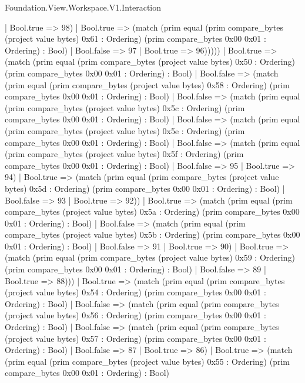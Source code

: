 \begin{lexlean}{Foundation.View.Workspace.V1.Interaction}
\begin{semanticmodule}
{                    | Bool.true => 98)
                  | Bool.true => (match (prim equal (prim compare_bytes (project value bytes) 0x61 : Ordering) (prim compare_bytes 0x00 0x01 : Ordering) : Bool)
                    | Bool.false => 97
                    | Bool.true => 96)))))
          | Bool.true => (match (prim equal (prim compare_bytes (project value bytes) 0x50 : Ordering) (prim compare_bytes 0x00 0x01 : Ordering) : Bool)
            | Bool.false => (match (prim equal (prim compare_bytes (project value bytes) 0x58 : Ordering) (prim compare_bytes 0x00 0x01 : Ordering) : Bool)
              | Bool.false => (match (prim equal (prim compare_bytes (project value bytes) 0x5c : Ordering) (prim compare_bytes 0x00 0x01 : Ordering) : Bool)
                | Bool.false => (match (prim equal (prim compare_bytes (project value bytes) 0x5e : Ordering) (prim compare_bytes 0x00 0x01 : Ordering) : Bool)
                  | Bool.false => (match (prim equal (prim compare_bytes (project value bytes) 0x5f : Ordering) (prim compare_bytes 0x00 0x01 : Ordering) : Bool)
                    | Bool.false => 95
                    | Bool.true => 94)
                  | Bool.true => (match (prim equal (prim compare_bytes (project value bytes) 0x5d : Ordering) (prim compare_bytes 0x00 0x01 : Ordering) : Bool)
                    | Bool.false => 93
                    | Bool.true => 92))
                | Bool.true => (match (prim equal (prim compare_bytes (project value bytes) 0x5a : Ordering) (prim compare_bytes 0x00 0x01 : Ordering) : Bool)
                  | Bool.false => (match (prim equal (prim compare_bytes (project value bytes) 0x5b : Ordering) (prim compare_bytes 0x00 0x01 : Ordering) : Bool)
                    | Bool.false => 91
                    | Bool.true => 90)
                  | Bool.true => (match (prim equal (prim compare_bytes (project value bytes) 0x59 : Ordering) (prim compare_bytes 0x00 0x01 : Ordering) : Bool)
                    | Bool.false => 89
                    | Bool.true => 88)))
              | Bool.true => (match (prim equal (prim compare_bytes (project value bytes) 0x54 : Ordering) (prim compare_bytes 0x00 0x01 : Ordering) : Bool)
                | Bool.false => (match (prim equal (prim compare_bytes (project value bytes) 0x56 : Ordering) (prim compare_bytes 0x00 0x01 : Ordering) : Bool)
                  | Bool.false => (match (prim equal (prim compare_bytes (project value bytes) 0x57 : Ordering) (prim compare_bytes 0x00 0x01 : Ordering) : Bool)
                    | Bool.false => 87
                    | Bool.true => 86)
                  | Bool.true => (match (prim equal (prim compare_bytes (project value bytes) 0x55 : Ordering) (prim compare_bytes 0x00 0x01 : Ordering) : Bool)
}
\end{semanticmodule}
\end{lexlean}
